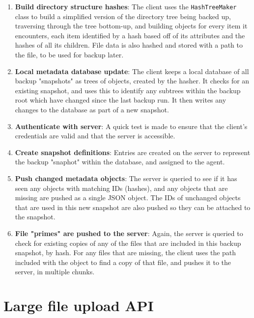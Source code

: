 \documentclass[bsc,frontabs,twoside,singlespacing,parskip,deptreport]{infthesis}     %
\begin{document}
\begin{enumerate}
	\item \textbf{Build directory structure hashes}:
	The client uses the \texttt{HashTreeMaker} class to build a simplified version of the 
	directory tree being backed up, traversing through the tree bottom-up, and building objects
	for every item it encounters, each item identified by a hash based off of its attributes
	and the hashes of all its children. File data is also hashed and stored with a path to the
	file, to be used for backup later.
	
	\item \textbf{Local metadata database update}:
	The client keeps a local database of all backup "snapshots" as trees of objects, created by
	the hasher. It checks for an existing snapshot, and uses this to identify any subtrees within
	the backup root which have changed since the last backup run. It then writes any changes to
	the database as part of a new snapshot.
	
	\item \textbf{Authenticate with server}:
	A quick test is made to ensure that the client's credentials are valid and that the server is
	accessible.
	
	\item \textbf{Create snapshot definitions}:
	Entries are created on the server to represent the backup "snaphot" within the database, and
	assigned to the agent.
	
	\item \textbf{Push changed metadata objects}:
	The server is queried to see if it has seen any objects with matching IDs (hashes), and any
	objects that are missing are pushed as a single JSON object. The IDs of unchanged objects
	that are used in this new snapshot are also pushed so they can be attached to the snapshot.
	
	\item \textbf{File "primes" are pushed to the server}:
	Again, the server is queried to check for existing copies of any of the files that are 
	included in this backup snapshot, by hash. For any files that are missing, the client uses
	the path included with the object to find a copy of that file, and pushes it to the server,
	in multiple chunks.
\end{enumerate}

\section{Large file upload API}
\end{document}
